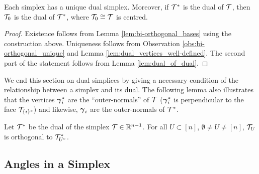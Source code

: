 \begin{theorem}
	\label{thm:dual_simplex}
Each simplex has a unique dual simplex. Moreover, if $\mathcal{T}^*$ is the dual of $\mathcal{T}$, then $\mathcal{T}_0$ is the dual of $\mathcal{T}^*$, where $\mathcal{T}_0\cong \mathcal{T}$ is centred. 
  \end{theorem}
\begin{proof}
Existence follows from Lemma \ref{lem:bi-orthogonal_bases} using the construction above. Uniqueness follows from Observation \ref{obs:bi-orthogonal_unique} and Lemma \ref{lem:dual_vertices_well-defined}. The second part of the statement follows from Lemma \ref{lem:dual_of_dual}. 
\end{proof}

We end  this section  on dual simplices by giving a necessary condition of the relationship between a simplex and its dual. The following lemma also illustrates that the vertices $\vb*{\gamma}_i^*$ are the ``outer-normals'' of $\mathcal{T}$ ($\vb*{\gamma}_i^*$ is perpendicular  to the face  $\mathcal{T}_{\{i\}^c}$)  and likewise, $\vb*{\gamma}_i$  are the outer-normals of $\mathcal{T}^*$. 

\begin{lemma}
	\label{lem:dual_faces_orthogonal}
	Let $\mathcal{T}^*$ be the dual of the simplex $\mathcal{T}\in\mathbb{R}^{n-1}$. For all $U\subset[n]$, $\emptyset\neq U\neq[n]$, $\mathcal{T}_U$ is orthogonal to $\mathcal{T}_{U^c}^*$.  
\end{lemma}

\subsection{Angles in a Simplex}
\label{sec:background_simplex_angles}

